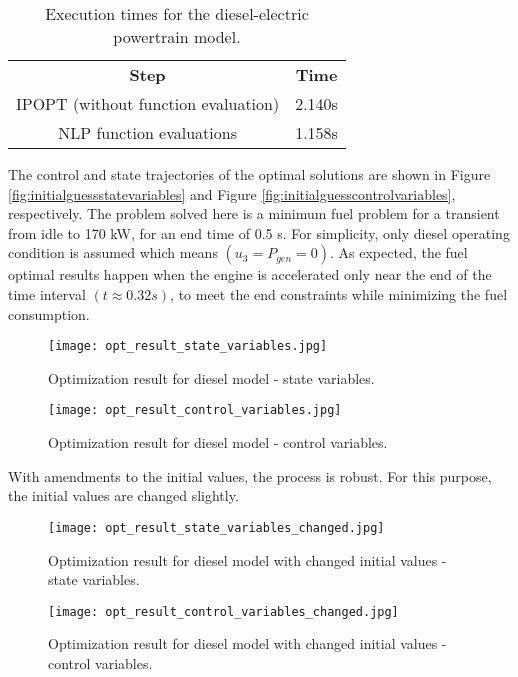 \begin{table}
\begin{center}
	\caption{Execution times for the diesel-electric powertrain model.} 
	\label{tab:table1} 
	\begin{tabular}{ cc } 
		\hline
		\bfseries Step & \bfseries Time  \\ 
		IPOPT (without function evaluation) & 2.140s \\ 
		NLP function evaluations & 1.158s \\ 
		\hline
	\end{tabular}
\end{center}
\end{table}

The control and state trajectories of the optimal solutions are shown in Figure \ref{fig:initialguessstatevariables} and Figure \ref{fig:initialguesscontrolvariables}, respectively. The problem solved here is a minimum fuel problem for a transient 
from idle to 170 kW, for an end time of 0.5 s. For simplicity, only diesel operating condition is assumed which
means $(u_3=P_{gen} = 0)$. As expected, the fuel optimal results happen when the engine is accelerated only near the
end of the time interval $(t\approx 0.32 s)$, to meet the end constraints while minimizing the fuel consumption.

\begin{figure}
	\texttt{[image: opt\_result\_state\_variables.jpg]}
	\caption{Optimization result for diesel model - state variables.}
	\label{fig:optimizationresultstatevariables}
\end{figure}

\begin{figure}
	\texttt{[image: opt\_result\_control\_variables.jpg]}
	\caption{Optimization result for diesel model - control variables.}
	\label{fig:optimizationresultcontrolvariables}
\end{figure}

With amendments to the initial values, the process is robust. For this purpose, the initial values are changed slightly.

\begin{figure}
	\texttt{[image: opt\_result\_state\_variables\_changed.jpg]}
	\caption{Optimization result for diesel model with changed initial values - state variables.}
	\label{fig:optimizationresultchangedstatevariables}
\end{figure}

\begin{figure}
	\texttt{[image: opt\_result\_control\_variables\_changed.jpg]}
	\caption{Optimization result for diesel model with changed initial values - control variables.}
	\label{fig:optimizationresultchangedcontrolvariables}
\end{figure}

